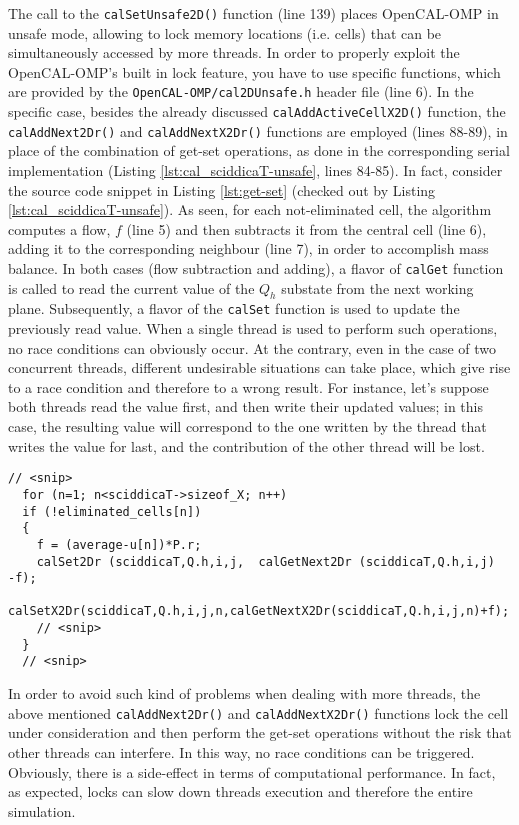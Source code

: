 The call to the \verb'calSetUnsafe2D()' function (line 139) places
OpenCAL-OMP in unsafe mode, allowing to lock memory locations
(i.e. cells) that can be simultaneously accessed by more threads. In
order to properly exploit the OpenCAL-OMP's built in lock feature, you
have to use specific functions, which are provided by the
\verb'OpenCAL-OMP/cal2DUnsafe.h' header file (line 6). In the specific
case, besides the already discussed \verb'calAddActiveCellX2D()'
function, the \verb'calAddNext2Dr()' and \verb'calAddNextX2Dr()'
functions are employed (lines 88-89), in place of the combination of
get-set operations, as done in the corresponding serial implementation
(Listing \ref{lst:cal_sciddicaT-unsafe}, lines 84-85). In fact,
consider the source code snippet in Listing \ref{lst:get-set} (checked
out by Listing \ref{lst:cal_sciddicaT-unsafe}). As seen, for
each not-eliminated cell, the algorithm computes a flow, $f$ (line 5)
and then subtracts it from the central cell (line 6), adding it to the
corresponding neighbour (line 7), in order to accomplish mass
balance. In both cases (flow subtraction and adding), a flavor of
\verb'calGet' function is called to read the current value of the
$Q_h$ substate from the next working plane. Subsequently, a flavor of
the \verb'calSet' function is used to update the previously read
value. When a single thread is used to perform such operations, no
race conditions can obviously occur. At the contrary, even in the case
of two concurrent threads, different undesirable situations can take
place, which give rise to a race condition and therefore to a wrong
result. For instance, let's suppose both threads read the value first,
and then write their updated values; in this case, the resulting value
will correspond to the one written by the thread that writes the value
for last, and the contribution of the other thread will be lost.

\begin{lstlisting}[float,floatplacement=H, label=lst:get-set, caption=Example of non atomic operation made of a combination of get-set calls.]
  // <snip>
  for (n=1; n<sciddicaT->sizeof_X; n++)
  if (!eliminated_cells[n])
  {
    f = (average-u[n])*P.r;
    calSet2Dr (sciddicaT,Q.h,i,j,  calGetNext2Dr (sciddicaT,Q.h,i,j)  -f);
    calSetX2Dr(sciddicaT,Q.h,i,j,n,calGetNextX2Dr(sciddicaT,Q.h,i,j,n)+f);
    // <snip>
  }
  // <snip>
\end{lstlisting}

In order to avoid such kind of problems when dealing with more
threads, the above mentioned \verb'calAddNext2Dr()' and
\verb'calAddNextX2Dr()' functions lock the cell under consideration
and then perform the get-set operations without the risk that other threads
can interfere. In this way, no race conditions can be
triggered. Obviously, there is a side-effect in terms of computational
performance. In fact, as expected, locks can slow down threads
execution and therefore the entire simulation.


